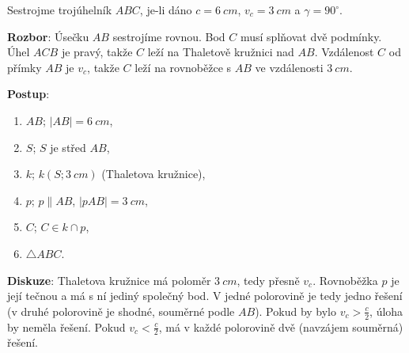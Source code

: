 \begin{example}
  Sestrojme trojúhelník $ABC$, je-li dáno $c = 6\ \si{cm}$, $v_c = 3\ \si{cm}$ a $\gamma = 90^\circ$.

  \textbf{Rozbor}: Úsečku $AB$ sestrojíme rovnou. Bod $C$ musí splňovat dvě podmínky. Úhel $ACB$ je pravý, takže $C$ leží na Thaletově kružnici nad $AB$. Vzdálenost $C$ od přímky $AB$ je $v_c$, takže $C$ leží na rovnoběžce s $AB$ ve vzdálenosti $3\ \si{cm}$.

  \textbf{Postup}:
  \begin{enumerate}
    \item $AB$; $|AB| = 6\ \si{cm}$,
    \item $S$; $S$ je střed $AB$,
    \item $k$; $k(S; 3\ \si{cm})$ (Thaletova kružnice),
    \item $p$; $p\parallel AB$, $|pAB| = 3\ \si{cm}$,
    \item $C$; $C\in k\cap p$,
    \item $\triangle ABC$.
  \end{enumerate}

  \textbf{Diskuze}: Thaletova kružnice má poloměr $3\ \si{cm}$, tedy přesně $v_c$. Rovnoběžka $p$ je její tečnou a má s ní jediný společný bod. V jedné polorovině je tedy jedno řešení (v druhé polorovině je shodné, souměrné podle $AB$). Pokud by bylo $v_c > \frac{c}{2}$, úloha by neměla řešení. Pokud $v_c < \frac{c}{2}$, má v každé polorovině dvě (navzájem souměrná) řešení.
  \begin{center}
  \end{center}
\end{example}

